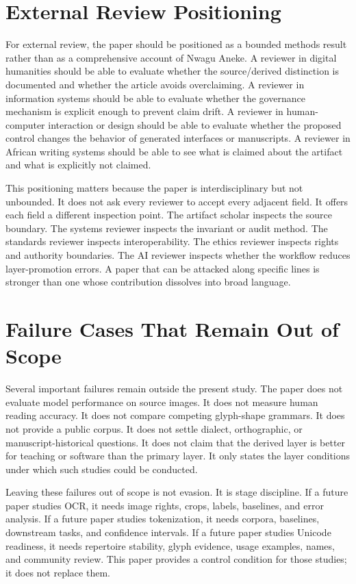 \documentclass[sigconf,nonacm]{acmart}
\begin{document}
\section{External Review Positioning}
For external review, the paper should be positioned as a bounded methods result
rather than as a comprehensive account of Nwagu Aneke. A reviewer in digital
humanities should be able to evaluate whether the source/derived distinction is
documented and whether the article avoids overclaiming. A reviewer in
information systems should be able to evaluate whether the governance mechanism
is explicit enough to prevent claim drift. A reviewer in human-computer
interaction or design should be able to evaluate whether the proposed control
changes the behavior of generated interfaces or manuscripts. A reviewer in
African writing systems should be able to see what is claimed about the artifact
and what is explicitly not claimed.

This positioning matters because the paper is interdisciplinary but not
unbounded. It does not ask every reviewer to accept every adjacent field. It
offers each field a different inspection point. The artifact scholar inspects
the source boundary. The systems reviewer inspects the invariant or audit
method. The standards reviewer inspects interoperability. The ethics reviewer
inspects rights and authority boundaries. The AI reviewer inspects whether the
workflow reduces layer-promotion errors. A paper that can be attacked along
specific lines is stronger than one whose contribution dissolves into broad
language.

\section{Failure Cases That Remain Out of Scope}
Several important failures remain outside the present study. The paper does not
evaluate model performance on source images. It does not measure human reading
accuracy. It does not compare competing glyph-shape grammars. It does not
provide a public corpus. It does not settle dialect, orthographic, or
manuscript-historical questions. It does not claim that the derived layer is
better for teaching or software than the primary layer. It only states the layer
conditions under which such studies could be conducted.

Leaving these failures out of scope is not evasion. It is stage discipline. If a
future paper studies OCR, it needs image rights, crops, labels, baselines, and
error analysis. If a future paper studies tokenization, it needs corpora,
baselines, downstream tasks, and confidence intervals. If a future paper studies
Unicode readiness, it needs repertoire stability, glyph evidence, usage
examples, names, and community review. This paper provides a control condition
for those studies; it does not replace them.
\end{document}
